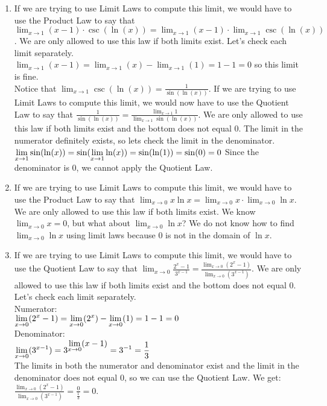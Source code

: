 \documentclass{ximera}
\begin{document}
\begin{question}
\begin{feedback}
\begin{enumerate}
   \item If we are trying to use Limit Laws to compute this limit, we would have to use the Product Law to say that $\lim_{x\to 1}{(x-1)\cdot \csc(\ln(x))}= \lim_{x\to 1}{(x-1)\cdot \lim_{x\to 1}\csc(\ln(x))}$.  We are only allowed to use this law if both limits exist.
   Let's check each limit separately.  \\
   $\lim_{x\to 1} (x-1) = \lim_{x\to 1} (x)-\lim_{x\to 1}(1)=1-1=0$ so this limit is fine.\\
   
   Notice that $\lim_{x\to 1}\csc(\ln(x)) = \frac{1}{\sin(\ln(x))}$.  If we are trying to use Limit Laws to compute this limit, we would now have to use the Quotient Law to say that $\frac{1}{\sin(\ln(x))}
   = \frac{\lim_{x\to 1}1}{\lim_{x\to 1}\sin(\ln(x))}$.  We are only allowed to use this law if both limits exist and the bottom does not equal 0.  The limit in the numerator definitely exists, so lets check the limit in the denominator.\\
    $\lim_{x\to 1}\sin(\ln(x)) \\
    = \sin(\lim_{x\to 1}\ln(x))\\
    = \sin(\ln(1))\\
    = \sin(0) = 0\\$
   Since the denominator is 0, we cannot apply the Quotient Law.  
     
   \item If we are trying to use Limit Laws to compute this limit, we would have to use the Product Law to say that $\lim_{x\to 0} x\ln x = \lim_{x\to 0} x \cdot \lim_{x\to 0}\ln x$.  We are only allowed to use this law if both limits exist.  We know $\lim_{x\to 0} x = 0$, but what about $\lim_{x\to 0}\ln x$?
   We do not know how to find $\lim_{x\to 0}\ln x$ using limit laws because 0 is not in the domain of $\ln x$.
   
   \item If we are trying to use Limit Laws to compute this limit, we would have to use the Quotient Law to say that $\lim_{x\to 0}\frac{2^x-1}{3^{x-1}}
   = \frac{\lim_{x\to 0}(2^x-1)}{\lim_{x\to 0}(3^{x-1})}$.  We are only allowed to use this law if both limits exist and the bottom does not equal 0.   Let's check each limit separately.\\
   Numerator:\\
   $\lim_{x\to 0}(2^x-1)\\
   =\lim_{x\to 0}(2^x)-\lim_{x\to 0}(1)\\
   =1-1=0$\\
   Denominator:\\
   $\lim_{x\to 0}(3^{x-1})\\
   =3^{\lim_{x\to 0}(x-1)}\\
   =3^{-1}=\frac{1}{3}$\\
   The limits in both the numerator and denominator exist and the limit in the denominator does not equal 0, so we can use the Quotient Law.  We get:\\
   $\frac{\lim_{x\to 0}(2^x-1)}{\lim_{x\to 0}(3^{x-1})}
   =\frac{0}{\frac{1}{3}}=0$.
   



\end{enumerate}
\end{feedback}
\end{question}
\end{document}
